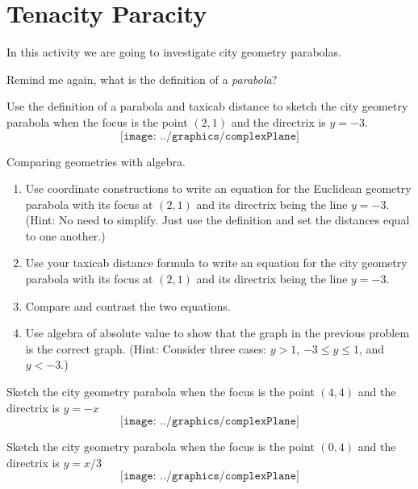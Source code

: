 \newpage
\section{Tenacity Paracity}
In this activity we are going to investigate city geometry parabolas.

\begin{prob} 
Remind me again, what is the definition of a \textit{parabola}?
\end{prob}
\vspace{0.5in}

\begin{prob}
Use the definition of a parabola and taxicab distance to sketch the city geometry parabola when the focus is the point $(2,1)$
and the directrix is $y=-3$. 
\[
\texttt{[image: ../graphics/complexPlane]}
\]
\end{prob}

\break
\begin{prob}
Comparing geometries with algebra. 
\begin{enumerate}
\item Use coordinate constructions to write an equation for the Euclidean geometry parabola with its focus at $(2,1)$ and its directrix being the line $y=-3$.  (Hint:  No need to simplify.  Just use the definition and set the distances equal to one another.)  
\vspace{0.5in}
\item Use your taxicab distance formula to write an equation for the city geometry parabola with its focus at $(2,1)$ and its directrix being the line $y=-3$.  
\vspace{0.5in}
\item Compare and contrast the two equations.  
\vspace{0.5in}
\item Use algebra of absolute value to show that the graph in the previous problem is the correct graph. 
 (Hint:  Consider three cases: $y>1$, $-3\leq y \leq 1$, and $y<-3$.)
\vfill
\end{enumerate}
\end{prob}

\break

\begin{prob}
Sketch the city geometry parabola when the focus is the point $(4,4)$
and the directrix is $y=-x$
\[
\texttt{[image: ../graphics/complexPlane]}
\]
\end{prob}

\break

\begin{prob}
Sketch the city geometry parabola when the focus is the point $(0,4)$
and the directrix is $y=x/3$
\[
\texttt{[image: ../graphics/complexPlane]}
\]
\end{prob}

